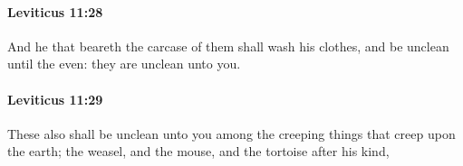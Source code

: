 		\paragraph{Leviticus 11:28} %
			\label{LEVITICUS-11-28}

			And he that beareth the carcase of them shall wash his clothes, and be unclean until the even: they are unclean unto you.


		\paragraph{Leviticus 11:29} %
			\label{LEVITICUS-11-29}

			These also shall be unclean unto you among the creeping things that creep upon the earth; the weasel, and the mouse, and the tortoise after his kind,


